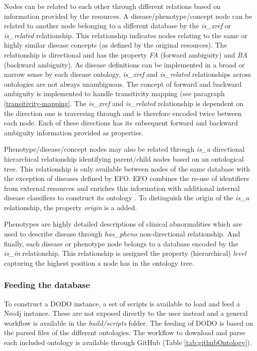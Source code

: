 \documentclass[9pt,a4paper,]{extarticle}
\begin{document}
Nodes can be related to each other through different relations based on information provided by the
resources. A disease/phenotype/concept node can be related to another node belonging to a different database by the \emph{is\_xref} or \emph{is\_related} relationship. This relationship indicates nodes relating to the same or highly similar disease concepts (as defined by the original resources). The relationship is directional and has the property \emph{FA} (forward ambiguity) and \emph{BA} (backward ambiguity). As disease definitions can be implemented in a broad or narrow sense by each disease ontology, \emph{is\_xref} and \emph{is\_related} relationships across ontologies are not always unambiguous. The concept of forward and backward ambiguity is implemented to handle transitivity mapping (see paragraph \ref{transitivity-mapping}. The \emph{is\_xref} and \emph{is\_related} relationship is dependent on the direction one is traversing through and is therefore encoded twice between each node. Each of these directions has its subsequent forward and backward ambiguity information provided as properties.

Phenotype/disease/concept nodes may also be related through \emph{is\_a} directional hierarchical relationship identifying parent/child nodes based on an ontological tree. This relationship is only available between nodes of the same database with the exception of diseases defined by EFO. EFO combines the re-use of identifiers from external resources and enriches this information with additional internal disease classifiers to construct its ontology \citep{Malone2010}. To distinguish the origin of the \emph{is\_a} relationship, the property \emph{origin} is a added.

Phenotypes are highly detailed descriptions of clinical abnormalities which are used to describe disease through \emph{has\_pheno} non-directional relationship. And finally, each disease or phenotype node belongs to a database encoded by the \emph{is\_in} relationship. This relationship is assigned the property (hierarchical) \emph{level} capturing the highest position a node has in the ontology tree.

\hypertarget{feeding-the-database}{%
\subsubsection{Feeding the database}\label{feeding-the-database}}

To construct a DODO instance, a set of scripts is available to load and feed a Neo4j instance. These are not exposed directly to the user instead and a general workflow is available in the \emph{build/scripts} folder. The feeding of DODO is based on the parsed files of the different ontologies. The workflow to download and parse each included ontology is available through GitHub (Table \ref{tab:githubOntology}).
\end{document}
